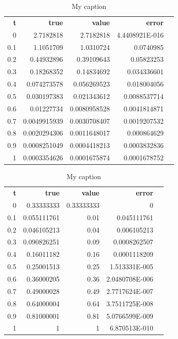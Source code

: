 \documentclass{article}
\begin{document}
\begin{table}[]
\centering
\caption{My caption}
\label{my-label}
\begin{tabular}{rrrrl}
\textbf{t} & \textbf{true} & \textbf{value} & \textbf{error} &  \\
0          & 2.7182818     & 2.7182818      & 4.4408921E-016 &  \\
0.1        & 1.1051709     & 1.0310724      & 0.0740985      &  \\
0.2        & 0.44932896    & 0.39109643     & 0.05823253     &  \\
0.3        & 0.18268352    & 0.14834692     & 0.034336601    &  \\
0.4        & 0.074273578   & 0.056269523    & 0.018004056    &  \\
0.5        & 0.030197383   & 0.021343612    & 0.0088537714   &  \\
0.6        & 0.01227734    & 0.0080958528   & 0.0041814871   &  \\
0.7        & 0.0049915939  & 0.0030708407   & 0.0019207532   &  \\
0.8        & 0.0020294306  & 0.0011648017   & 0.000864629    &  \\
0.9        & 0.0008251049  & 0.0004418213   & 0.0003832836   &  \\
1          & 0.0003354626  & 0.0001675874   & 0.0001678752   
\end{tabular}
\end{table}

\begin{table}[]
\centering
\caption{My caption}
\label{my-label}
\begin{tabular}{rrrrl}
\textbf{t} & \textbf{true} & \textbf{value} & \textbf{error} &  \\
0          & 0.33333333    & 0.33333333     & 0              &  \\
0.1        & 0.055111761   & 0.01           & 0.045111761    &  \\
0.2        & 0.046105213   & 0.04           & 0.006105213    &  \\
0.3        & 0.090826251   & 0.09           & 0.0008262507   &  \\
0.4        & 0.16011182    & 0.16           & 0.0001118209   &  \\
0.5        & 0.25001513    & 0.25           & 1.513331E-005  &  \\
0.6        & 0.36000205    & 0.36           & 2.0480708E-006 &  \\
0.7        & 0.49000028    & 0.49           & 2.7717624E-007 &  \\
0.8        & 0.64000004    & 0.64           & 3.7511725E-008 &  \\
0.9        & 0.81000001    & 0.81           & 5.0766599E-009 &  \\
1          & 1             & 1              & 6.870513E-010  & 
\end{tabular}
\end{table}
\end{document}
